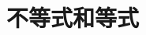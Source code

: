 \documentclass[../main.tex]{subfiles} %
\begin{document}
\chapter{不等式和等式}





% 

% 

% 

% 

% 

% 

% 

% 
\end{document}
